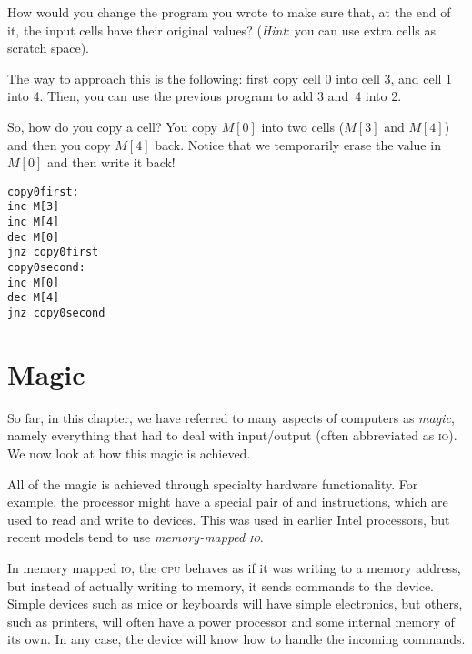 \begin{exercise}
How would you change the program you wrote to make sure that, at the end of it,
the input cells have their original values? (\emph{Hint}: you can use extra
cells as scratch space).
\begin{solution}
The way to approach this is the following: first copy cell 0 into cell 3, and
cell 1 into 4. Then, you can use the previous program to add 3 and~4 into 2.

So, how do you copy a cell? You copy $M[0]$ into two cells ($M[3]$ and $M[4]$)
and then you copy $M[4]$ back. Notice that we temporarily erase the value in
$M[0]$ and then write it back!

\begin{verbatim}
copy0first:
inc M[3]
inc M[4]
dec M[0]
jnz copy0first
copy0second:
inc M[0]
dec M[4]
jnz copy0second
\end{verbatim}
\end{solution}
\end{exercise}

\section{Magic}

So far, in this chapter, we have referred to many aspects of computers as
\textit{magic}, namely everything that had to deal with input/output (often
abbreviated as \textsc{io}). We now look at how this magic is achieved.

All of the magic is achieved through specialty hardware functionality. For
example, the processor might have a special pair of  and
 instructions, which are used to read and write to devices.
This was used in earlier Intel processors, but recent models tend to use
\emph{memory-mapped \textsc{io}}.

In memory mapped \textsc{io}, the \textsc{cpu} behaves as if it was writing to
a memory address, but instead of actually writing to memory, it sends commands
to the device. Simple devices such as mice or keyboards will have simple
electronics, but others, such as printers, will often have a power processor
and some internal memory of its own. In any case, the device will know how to
handle the incoming commands.

